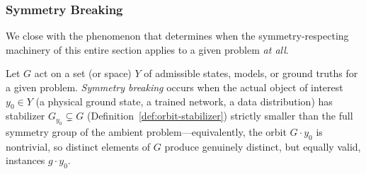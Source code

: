 \documentclass[mathematics,review,submit,moreauthors]{Definitions/mdpi}
\begin{document}
\subsubsection{Symmetry Breaking}
\label{subsec:symmetry-breaking}

We close with the phenomenon that determines when the symmetry-respecting
machinery of this entire section applies to a given problem \emph{at all}.

\begin{Definition}
\label{def:symmetry-breaking}
Let $G$ act on a set (or space) $Y$ of admissible states, models, or ground
truths for a given problem. \emph{Symmetry breaking} occurs when the actual
object of interest $y_0 \in Y$ (a physical ground state, a trained network,
a data distribution) has stabilizer $G_{y_0} \subsetneq G$
(Definition~\ref{def:orbit-stabilizer}) strictly smaller than the full
symmetry group of the ambient problem---equivalently, the orbit
$G \cdot y_0$ is nontrivial, so distinct elements of $G$ produce genuinely
distinct, but equally valid, instances $g \cdot y_0$.
\end{Definition}
\end{document}
